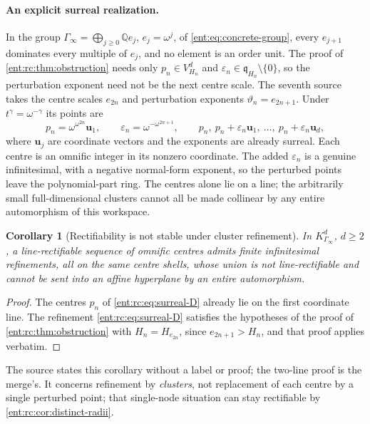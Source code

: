 \documentclass[11pt]{article}
\theoremstyle{plain}
\theoremstyle{plain}
\theoremstyle{plain}
\newtheorem{corollary}[corollary]{Corollary}
\theoremstyle{definition}
\theoremstyle{definition}
\theoremstyle{definition}
\theoremstyle{definition}
\theoremstyle{remark}
\newcommand{\Q}{\mathbb Q}\newcommand{\Z}{\mathbb Z}\newcommand{\N}{\mathbb N}
\begin{document}
\paragraph{An explicit surreal realization.}
In the group $\Gamma_\infty=\bigoplus_{j\ge0}\Q e_j$, $e_j=\omega^j$, of
\eqref{ent:eq:concrete-group}, every $e_{j+1}$ dominates every multiple of
$e_j$, and no element is an order unit. The proof of
\cref{ent:rc:thm:obstruction} needs only $p_n\in V_{H_n}^d$ and
$\varepsilon_n\in\mathfrak q_{H_n}\setminus\{0\}$, so the perturbation
exponent need not be the next centre scale. The seventh source takes the
centre scales $e_{2n}$ and perturbation exponents $\vartheta_n=e_{2n+1}$. Under
$t^\gamma=\omega^{-\gamma}$ its points are
\begin{equation}\label{ent:rc:eq:surreal-D}
 p_n=\omega^{\omega^{2n}}\mathbf u_1,\qquad
 \varepsilon_n=\omega^{-\omega^{2n+1}},\qquad
 p_n,\ p_n+\varepsilon_n\mathbf u_1,\ \ldots,\ p_n+\varepsilon_n\mathbf u_d ,
\end{equation}
where $\mathbf u_j$ are coordinate vectors and the exponents are already
surreal. Each centre is an omnific integer in its nonzero coordinate. The
added $\varepsilon_n$ is a genuine infinitesimal, with a negative normal-form
exponent, so the perturbed points leave the polynomial-part ring. The centres
alone lie on a line; the arbitrarily small full-dimensional clusters cannot all
be made collinear by any entire automorphism of this workspace.

\begin{corollary}[Rectifiability is not stable under cluster refinement]
\label{ent:rc:cor:refinement}
In $K_{\Gamma_\infty}^d$, $d\ge2$, a line-rectifiable sequence of omnific
centres admits finite infinitesimal refinements, all on the same centre
shells, whose union is not line-rectifiable and cannot be sent into an affine
hyperplane by an entire automorphism.
\end{corollary}
\begin{proof}
The centres $p_n$ of \eqref{ent:rc:eq:surreal-D} already lie on the first
coordinate line. The refinement \eqref{ent:rc:eq:surreal-D} satisfies the
hypotheses of the proof of \cref{ent:rc:thm:obstruction} with
$H_n=H_{e_{2n}}$, since $e_{2n+1}>H_n$, and that proof applies verbatim.
\end{proof}

The source states this corollary without a label or proof; the two-line proof
is the merge's. It concerns refinement by \emph{clusters}, not replacement of
each centre by a single perturbed point; that single-node situation can stay
rectifiable by \cref{ent:rc:cor:distinct-radii}.
\end{document}
